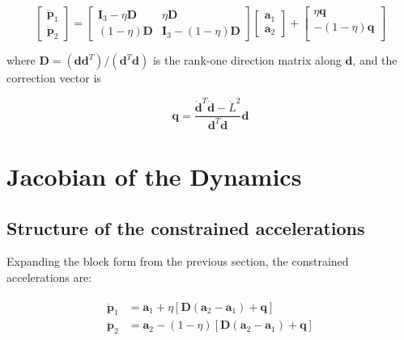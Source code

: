 \documentclass[]{article}
\begin{document}
\begin{equation}
    \begin{bmatrix}
        \ddot{\mathbf{p}}_1 \\
        \ddot{\mathbf{p}}_2
    \end{bmatrix} = \begin{bmatrix}
        \mathbf{I}_3 - \eta \mathbf{D} & \eta \mathbf{D} \\
        (1-\eta) \mathbf{D} & \mathbf{I}_3 - (1-\eta) \mathbf{D}
    \end{bmatrix} \begin{bmatrix}
        \mathbf{a}_1 \\
        \mathbf{a}_2 \end{bmatrix} + \begin{bmatrix}
            \eta \mathbf{q} \\
            -(1-\eta) \mathbf{q} \\
        \end{bmatrix}
\end{equation}

where $\mathbf{D} = (\mathbf{d} \mathbf{d}^T) / (\mathbf{d}^T \mathbf{d})$ is the rank-one direction matrix along $\mathbf{d}$, and the correction vector is

\begin{equation}
    \mathbf{q} = \frac{\dot{\mathbf{d}}^T \dot{\mathbf{d}} - \dot{L}^2}{\mathbf{d}^T \mathbf{d}} \mathbf{d}
\end{equation}

\section{Jacobian of the Dynamics}
\label{sec:jacobian}

\subsection{Structure of the constrained accelerations}

Expanding the block form from the previous section, the constrained accelerations are:

\begin{align}
\begin{split}
    \ddot{\mathbf{p}}_1 &= \mathbf{a}_1 + \eta \left[ \mathbf{D} (\mathbf{a}_2 - \mathbf{a}_1) + \mathbf{q} \right] \\
    \ddot{\mathbf{p}}_2 &= \mathbf{a}_2 - (1-\eta) \left[ \mathbf{D} (\mathbf{a}_2 - \mathbf{a}_1) + \mathbf{q} \right]
\end{split}
\end{align}
\end{document}
